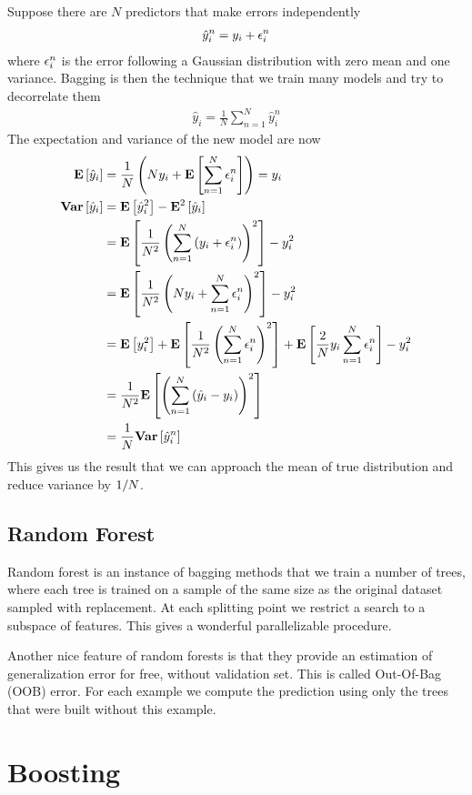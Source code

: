 Suppose there are $N$ predictors that make errors independently
\begin{align*}
	\hat{y}_i^n=y_i+\epsilon_i^n
\end{align*}
where $\epsilon_i^n$ is the error following a Gaussian distribution with zero mean and one variance. Bagging is then the technique that we train many models and try to decorrelate them
\begin{align*}
	\hat{y}_i=\frac{1}{N}\sum_{n=1}^N\hat{y}_i^n
\end{align*}
The expectation and variance of the new model are now
\begin{align*}
	\mathbf{E}\left[\hat{y}_i\right]&=\frac{1}{N}\left(Ny_i+\mathbf{E}\left[\sum_{n=1}^N\epsilon_i^n\right]\right)=y_i \\
	\mathbf{Var}\left[\hat{y}_i\right]&=\mathbf{E}\left[\hat{y}_i^2\right]-\mathbf{E}^2\left[\hat{y}_i\right] \\
	&=\mathbf{E}\left[\frac{1}{N^2}\left(\sum_{n=1}^N\left(y_i+\epsilon_i^n\right)\right)^2\right]-y_i^2 \\
	&=\mathbf{E}\left[\frac{1}{N^2}\left(Ny_i+\sum_{n=1}^N\epsilon_i^n\right)^2\right]-y_i^2 \\
	&=\mathbf{E}\left[y_i^2\right]+\mathbf{E}\left[\frac{1}{N^2}\left(\sum_{n=1}^N\epsilon_i^n\right)^2\right]+\mathbf{E}\left[\frac{2}{N}y_i\sum_{n=1}^N\epsilon_i^n\right]-y_i^2 \\
	&=\frac{1}{N^2}\mathbf{E}\left[\left(\sum_{n=1}^N\left(\hat{y}_i-y_i\right)\right)^2\right] \\
	&=\frac{1}{N}\mathbf{Var}\left[\hat{y}_i^n\right]
\end{align*}
This gives us the result that we can approach the mean of true distribution and reduce variance by $1/N$.

\subsection{Random Forest}

Random forest is an instance of bagging methods that we train a number of trees, where each tree is trained on a sample of the same size as the original dataset sampled with replacement. At each splitting point we restrict a search to a subspace of features. This gives a wonderful parallelizable procedure.

Another nice feature of random forests is that they provide an estimation of generalization error for free, without validation set. This is called Out-Of-Bag (OOB) error. For each example we compute the prediction using only the trees that were built without this example.



\section{Boosting}
\label{section10.3}

